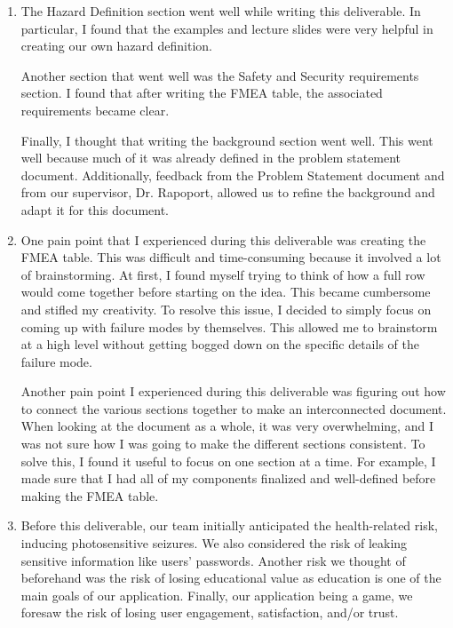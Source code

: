 \documentclass{article}
\begin{document}
\begin{enumerate}
    \item The Hazard Definition section went well while writing this deliverable. In particular, I found that the examples and lecture slides were very helpful in creating our own hazard definition.
    
    Another section that went well was the Safety and Security requirements section. I found that after writing the FMEA table, the associated requirements became clear.

    Finally, I thought that writing the background section went well. This went well because much of it was already defined in the problem statement document. Additionally, feedback from the Problem Statement document and from our supervisor, Dr. Rapoport, allowed us to refine the background and adapt it for this document.

    \item One pain point that I experienced during this deliverable was creating the FMEA table. This was difficult and time-consuming because it involved a lot of brainstorming. At first, I found myself trying to think of how a full row would come together before starting on the idea. This became cumbersome and stifled my creativity. To resolve this issue, I decided to simply focus on coming up with failure modes by themselves. This allowed me to brainstorm at a high level without getting bogged down on the specific details of the failure mode.
    
    Another pain point I experienced during this deliverable was figuring out how to connect the various sections together to make an interconnected document. When looking at the document as a whole, it was very overwhelming, and I was not sure how I was going to make the different sections consistent. To solve this, I found it useful to focus on one section at a time. For example, I made sure that I had all of my components finalized and well-defined before making the FMEA table.
    
    \item Before this deliverable, our team initially anticipated the health-related risk, inducing photosensitive seizures. We also considered the risk of leaking sensitive information like users' passwords. Another risk we thought of beforehand was the risk of losing educational value as education is one of the main goals of our application. Finally, our application being a game, we foresaw the risk of losing user engagement, satisfaction, and/or trust.


\end{enumerate}
\end{document}
